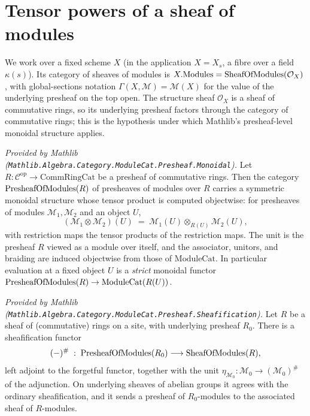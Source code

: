 \section{Tensor powers of a sheaf of modules}
\label{sec:sgr_tensor_powers}

We work over a fixed scheme \(X\) (in the application \(X = X_s\), a fibre over a
field \(\kappa(s)\)). Its category of sheaves of modules is
\(X.\mathrm{Modules} = \mathrm{SheafOfModules}(\mathcal{O}_X)\), with global-sections notation
\(\Gamma(X, \mathcal{M}) = \mathcal{M}(X)\) for the value of the underlying
presheaf on the top open. The structure sheaf \(\mathcal{O}_X\) is a sheaf of
commutative rings, so its underlying presheaf factors through the category of
commutative rings; this is the hypothesis under which Mathlib's presheaf-level
monoidal structure applies.

\begin{lemma}
  \label{lem:presheafModule_monoidal_mathlib}
  \mathlibok
  \textit{Provided by Mathlib
  (\texttt{Mathlib.Algebra.Category.ModuleCat.Presheaf.Monoidal}).}
  Let \(R : \mathcal{C}^{\mathrm{op}} \to \mathrm{CommRingCat}\) be a presheaf of
  commutative rings. Then the category \(\mathrm{PresheafOfModules}(R)\) of presheaves of modules
  over \(R\) carries a symmetric monoidal structure whose tensor product is
  computed objectwise: for presheaves of modules \(\mathcal{M}_1, \mathcal{M}_2\)
  and an object \(U\),
  \[
    (\mathcal{M}_1 \otimes \mathcal{M}_2)(U)
      \;=\; \mathcal{M}_1(U) \otimes_{R(U)} \mathcal{M}_2(U),
  \]
  with restriction maps the tensor products of the restriction maps. The unit is
  the presheaf \(R\) viewed as a module over itself, and the associator,
  unitors, and braiding are induced objectwise from those of
  \(\mathrm{ModuleCat}\). In particular evaluation at a fixed object \(U\) is a
  \emph{strict} monoidal functor
  \(\mathrm{PresheafOfModules}(R) \to \mathrm{ModuleCat}(R(U))\).
\end{lemma}

\begin{lemma}
  \label{lem:presheafModule_sheafification_mathlib}
  \mathlibok
  \textit{Provided by Mathlib
  (\texttt{Mathlib.Algebra.Category.ModuleCat.Presheaf.Sheafification}).}
  Let \(R\) be a sheaf of (commutative) rings on a site, with underlying
  presheaf \(R_0\). There is a sheafification functor
  \[
    (-)^{\#} \;:\; \mathrm{PresheafOfModules}(R_0) \longrightarrow \mathrm{SheafOfModules}(R),
  \]
  left adjoint to the forgetful functor, together with the unit
  \(\eta_{\mathcal{M}_0} : \mathcal{M}_0 \to (\mathcal{M}_0)^{\#}\) of the
  adjunction. On underlying sheaves of abelian groups it agrees with the
  ordinary sheafification, and it sends a presheaf of \(R_0\)-modules to the
  associated sheaf of \(R\)-modules.
\end{lemma}

